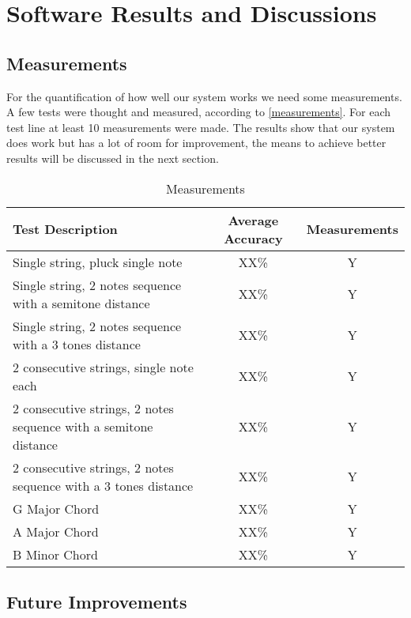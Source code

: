 \section{Software Results and Discussions}

\subsection{Measurements}
For the quantification of how well our system works we need some measurements.
A few tests were thought and measured, according to \autoref{measurements}.
For each test line at least 10 measurements were made. The results show that
our system does work but has a lot of room for improvement, the means to achieve
better results will be discussed in the next section.

\begin{table}[htb]
  \begin{center}
    \ABNTEXreducedfont
    \caption[Measurements]{Measurements}
    \label{measurements}
    \begin{tabular}{p{10cm}|c|c}
      \hline
      Test Description & Average Accuracy & Measurements\\
      \hline \hline
      Single string, pluck single note & XX\% & Y\\ \hline
      Single string, 2 notes sequence with a semitone distance & XX\% & Y \\ \hline
      Single string, 2 notes sequence with a 3 tones distance & XX\% & Y \\ \hline
      2 consecutive strings, single note each & XX\% & Y \\ \hline
      2 consecutive strings, 2 notes sequence with a semitone distance & XX\% & Y \\ \hline
      2 consecutive strings, 2 notes sequence with a 3 tones distance & XX\% & Y \\ \hline
      G Major Chord & XX\% & Y \\ \hline
      A Major Chord & XX\% & Y \\ \hline
      B Minor Chord & XX\% & Y \\ \hline
      \hline
    \end{tabular}
  \end{center}
\end{table}

\subsection{Future Improvements}
